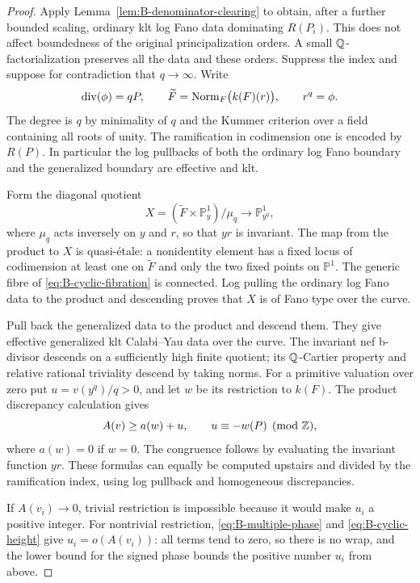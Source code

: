 \begin{proof}
Apply Lemma~\ref{lem:B-denominator-clearing} to obtain, after a
further bounded scaling, ordinary klt log Fano data dominating
$R(P_i)$.  This does not affect boundedness of the original
principalization orders.  A small $\mathbb Q$-factorialization preserves
all the data and these orders.  Suppress the index and suppose
for contradiction that $q\to\infty$.  Write
\[
 \operatorname{div}(\phi)=qP,
 \qquad
 \widetilde F=\operatorname{Norm}_F\bigl(k(F)(r)\bigr),
 \qquad r^q=\phi.
\]
The degree is $q$ by minimality of $q$ and the Kummer criterion
over a field containing all roots of unity.  The ramification in
codimension one is encoded by $R(P)$.  In particular the log
pullbacks of both the ordinary log Fano boundary and the
generalized boundary are effective and klt.

Form the diagonal quotient
\begin{equation}\label{eq:B-cyclic-fibration}
 X=(\widetilde F\times\mathbb P^1_y)/\mu_q
 \longrightarrow\mathbb P^1_{y^q},
\end{equation}
where $\mu_q$ acts inversely on $y$ and $r$, so that $yr$ is
invariant.  The map from the product to $X$ is quasi-\'etale:
a nonidentity element has a fixed locus of codimension at least
one on $\widetilde F$ and only the two fixed points on
$\mathbb P^1$.  The generic fibre of \eqref{eq:B-cyclic-fibration}
is connected.  Log pulling the ordinary log Fano data to the
product and descending proves that $X$ is of Fano type over the
curve.

Pull back the generalized data to the product and descend them.
They give effective generalized klt Calabi--Yau data over the
curve.  The invariant nef b-divisor descends on a sufficiently
high finite quotient; its $\mathbb Q$-Cartier property and relative
rational triviality descend by taking norms.  For a primitive
valuation over zero put
$u=v(y^q)/q>0$, and let $w$ be its restriction to $k(F)$.
The product discrepancy calculation gives
\begin{equation}\label{eq:B-cyclic-height}
 A(v)\ge a(w)+u,
 \qquad u\equiv-w(P)\pmod{\mathbb Z},
\end{equation}
where $a(w)=0$ if $w=0$.  The congruence follows by evaluating
the invariant function $yr$.  These formulas can equally be
computed upstairs and divided by the ramification index, using
log pullback and homogeneous discrepancies.

If $A(v_i)\to0$, trivial restriction is impossible because it
would make $u_i$ a positive integer.  For nontrivial restriction,
\eqref{eq:B-multiple-phase} and \eqref{eq:B-cyclic-height} give
$u_i=o(A(v_i))$: all terms tend to zero, so there is no wrap,
and the lower bound for the signed phase bounds the positive
number $u_i$ from above.


\end{proof}
